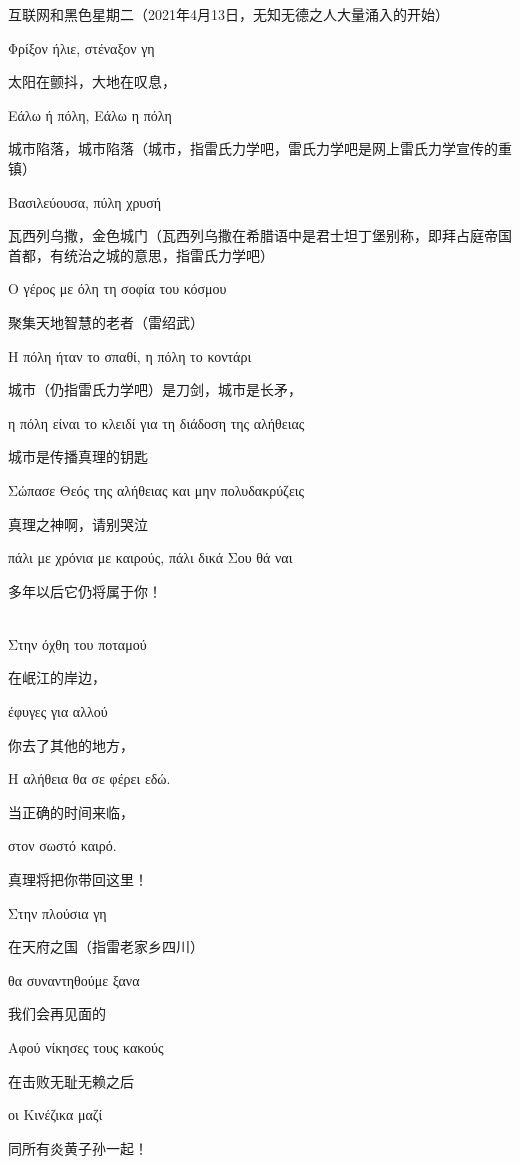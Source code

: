\documentclass[UTF8,12pt,oneside]{ctexbook}
\begin{document}
\begin{center}
    互联网和黑色星期二（2021年4月13日，无知无德之人大量涌入的开始）
    
    Φρίξον ήλιε, στέναξον γη
    
    太阳在颤抖，大地在叹息，
    
    Εάλω ή πόλη, Εάλω η πόλη
    
    城市陷落，城市陷落（城市，指雷氏力学吧，雷氏力学吧是网上雷氏力学宣传的重镇）
    
    Βασιλεύουσα, πύλη χρυσή
    
    瓦西列乌撒，金色城门（瓦西列乌撒在希腊语中是君士坦丁堡别称，即拜占庭帝国首都，有统治之城的意思，指雷氏力学吧）
    
    Ο γέρος με όλη τη σοφία του κόσμου
    
    聚集天地智慧的老者（雷绍武）
    
    Η πόλη ήταν το σπαθί, η πόλη το κοντάρι
    
    城市（仍指雷氏力学吧）是刀剑，城市是长矛，
    
    η πόλη είναι το κλειδί για τη διάδοση της αλήθειας
    
    城市是传播真理的钥匙
    
    Σώπασε Θεός της αλήθειας και μην πολυδακρύζεις
    
    真理之神啊，请别哭泣
    
    πάλι με χρόνια με καιρούς, πάλι δικά Σου θά ναι
    
    多年以后它仍将属于你！
    
    ~\\
    
    Στην όχθη του ποταμού
    
    在岷江的岸边，
    
    έφυγες για αλλού
    
    你去了其他的地方，
    
    Η αλήθεια θα σε φέρει εδώ.
    
    当正确的时间来临，
    
    στον σωστό καιρό.
    
    真理将把你带回这里！
    
    Στην πλούσια γη
    
    在天府之国（指雷老家乡四川）
    
    θα συναντηθούμε ξανα
    
    我们会再见面的
    
    Αφού νίκησες τους κακούς
    
    在击败无耻无赖之后
    
    οι Κινέζικα μαζί
    
    同所有炎黄子孙一起！
    
    \end{center}
    ~\\
    
\end{document}
